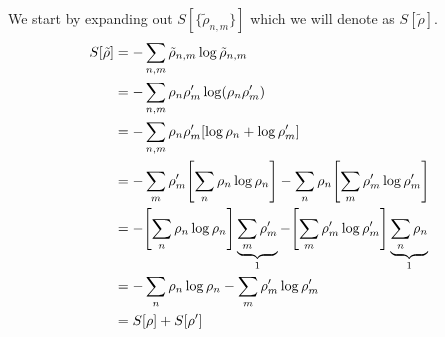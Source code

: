 \documentclass[boxes,pages]{homework}
\makeatletter
\numberwithin{@problem}{section}
\makeatother
\begin{document}
\begin{solution}
	We start by expanding out $S[\{\tilde{\rho}_{n,m}\}]$ which we will denote as $S[\tilde{\rho}]$.
	\begin{align*}
		S[\tilde{\rho}] & = -\sum_{n, m}\tilde{\rho}_{n, m}\log\tilde{\rho}_{n, m}                                                                 \\
		                & = -\sum_{n, m}\rho_n\rho_m'\log(\rho_n\rho_m')                                                                           \\
		                & = -\sum_{n, m}\rho_n\rho_m'\qty[\log\rho_n + \log\rho_m']                                                                \\
		                & = - \sum_m\rho_m'\qty[\sum_n\rho_n\log\rho_n] - \sum_n\rho_n\qty[\sum_m\rho_m'\log\rho_m']                               \\
		                & = - \qty[\sum_n\rho_n\log\rho_n]\underbrace{\sum_m\rho_m'}_1 - \qty[\sum_m\rho_m'\log\rho_m']\underbrace{\sum_n\rho_n}_1 \\
		                & = - \sum_n\rho_n\log\rho_n - \sum_m\rho_m'\log\rho_m'                                                                    \\
		                & = S[\rho] + S[\rho']
	\end{align*}
\end{solution}
\end{document}
